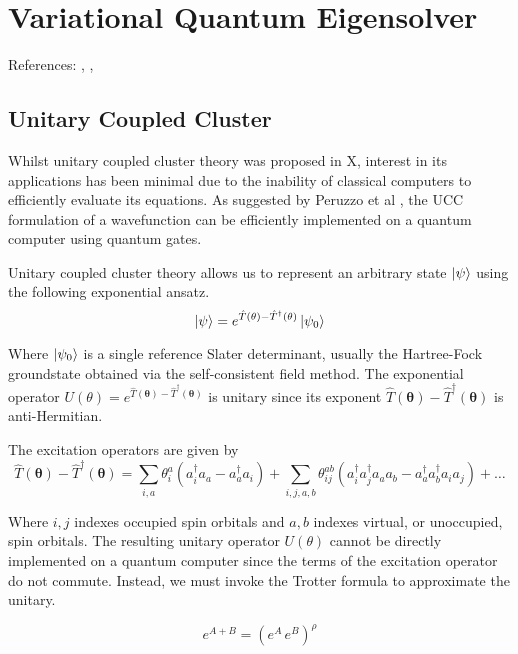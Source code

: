 \section{Variational Quantum Eigensolver}
References: \cite{Anand2021}, \cite{McClean2016}, \cite{Chan2021}

\subsection{Unitary Coupled Cluster}

Whilst unitary coupled cluster theory was proposed in X, interest in its applications has been minimal due to the inability of classical computers to efficiently evaluate its equations. As suggested by Peruzzo et al \cite{Peruzzo2014}, the UCC formulation of a wavefunction can be efficiently implemented on a quantum computer using quantum gates.

Unitary coupled cluster theory allows us to represent an arbitrary state $\ket\psi$ using the following exponential ansatz.
\begin{equation*}
    \ket\psi = e^{\hat T(\mathbf{\theta}) - \hat T^\dagger(\mathbf{\theta})} \ket{\psi_0}
\end{equation*}

Where $\ket{\psi_0}$ is a single reference Slater determinant, usually the Hartree-Fock groundstate obtained via the self-consistent field method. The exponential operator $U(\theta) = e^{\hat T(\mathbf{\theta}) - \hat T^\dagger(\mathbf{\theta})}$ is unitary since its exponent $\hat T(\mathbf{\theta}) - \hat T^\dagger(\mathbf{\theta})$ is anti-Hermitian.

The excitation operators are given by
\begin{equation*}
\hat T(\mathbf{\theta}) - \hat T^{\dagger}(\mathbf{\theta}) =
\sum_{i, a} \theta^a_i (a^\dagger_i a_a - a^\dagger_a a_i) + 
\sum_{i, j, a, b} \theta^{ab}_{ij} (a^\dagger_i a^\dagger_j a_a a_b - a^\dagger_a a^\dagger_b a_i a_j) + \dots
\end{equation*}

Where $i, j$ indexes occupied spin orbitals and $a, b$ indexes virtual, or unoccupied, spin orbitals. The resulting unitary operator $U(\theta)$ cannot be directly implemented on a quantum computer since the terms of the excitation operator do not commute. Instead, we must invoke the Trotter formula to approximate the unitary.

\begin{equation*}
    e^{A+B} = (e^A \, e^B)^\rho
\end{equation*}

